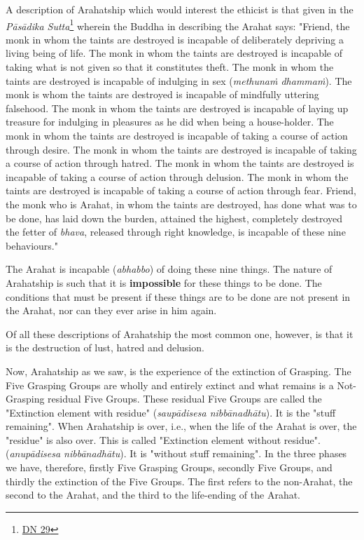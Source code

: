 A description of Arahatship which would interest the ethicist is that
given in the \emph{Pāsādika Sutta}\footnote{\href{https://suttacentral.net/dn29/en/sujato}{DN 29}} wherein the
Buddha in describing the Arahat says: "Friend, the monk in whom the
taints are destroyed is incapable of deliberately depriving a living
being of life. The monk in whom the taints are destroyed is incapable
of taking what is not given so that it constitutes theft. The monk in
whom the taints are destroyed is incapable of indulging in sex
(\emph{methunaṁ dhammaṁ}). The monk is whom the taints are destroyed is
incapable of mindfully uttering falsehood. The monk in whom the taints
are destroyed is incapable of laying up treasure for indulging in
pleasures as he did when being a house-holder. The monk in whom the
taints are destroyed is incapable of taking a course of action through
desire. The monk in whom the taints are destroyed is incapable of
taking a course of action through hatred. The monk in whom the taints
are destroyed is incapable of taking a course of action through
delusion. The monk in whom the taints are destroyed is incapable of
taking a course of action through fear. Friend, the monk who is Arahat,
in whom the taints are destroyed, has done what was to be done, has
laid down the burden, attained the highest, completely destroyed the
fetter of \emph{bhava}, released through right knowledge, is incapable of
these nine behaviours."


The Arahat is incapable (\emph{abhabbo}) of doing these nine things. The
nature of Arahatship is such that it is \textbf{impossible} for these things to
be done. The conditions that must be present if these things are to be
done are not present in the Arahat, nor can they ever arise in him
again.


Of all these descriptions of Arahatship the most common one, however, is
that it is the destruction of lust, hatred and delusion.


\label{remainder}Now, Arahatship as we saw, is the experience of the extinction of
Grasping. The Five Grasping Groups are wholly and entirely extinct and
what remains is a Not-Grasping residual Five Groups. These residual Five
Groups are called the "Extinction element with residue" (\emph{saupādisesa
nibbānadhātu}). It is the "stuff remaining". When Arahatship is over,
i.e., when the life of the Arahat is over, the "residue" is also over.
This is called "Extinction element without residue". (\emph{anupādisesa
nibbānadhātu}). It is "without stuff remaining". In the three phases we
have, therefore, firstly Five Grasping Groups, secondly Five Groups, and
thirdly the extinction of the Five Groups. The first refers to the
non-Arahat, the second to the Arahat, and the third to the life-ending
of the Arahat.


